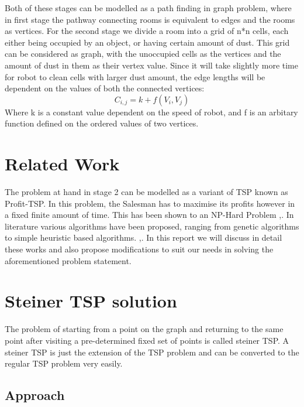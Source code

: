 \documentclass{article}
\begin{document}
Both of these stages can be modelled as a path finding in graph problem, where in first stage the pathway connecting rooms is equivalent to edges and the rooms as vertices.
For the second stage we divide a room into a grid of n*n cells, each either being occupied by an object, or having certain amount of dust. This grid can be considered as graph,
with the unoccupied cells as the vertices and the amount of dust in them as their vertex value. Since it will take slightly more time for robot to clean cells with larger dust amount,
the edge lengths will be dependent on the values of both the connected vertices:
\begin{equation}
    C_{i,j} = k + f(V_i,V_j)
\end{equation}
Where k is a constant value dependent on the speed of robot, and f is an arbitary function defined on the ordered values of two vertices.




\section{Related Work}

The problem at hand in stage 2 can be modelled as a variant of TSP  known as Profit-TSP. In this problem,
the Salesman has to maximise its profits however in a fixed finite amount of time. 
This has been shown to an NP-Hard Problem \cite{RAMESH1991151},\cite{apps2}. 
In literature various algorithms have been proposed, ranging from genetic algorithms to simple heuristic based algorithms. \cite{RAMESH1991151},\cite{rw1}.
In this report we will discuss in detail these works and also propose modifications to suit our needs in solving the aforementioned problem statement.



\section{Steiner TSP solution}

The problem of starting from a point on the graph and returning to the same point after visiting a pre-determined fixed
set of points is called steiner TSP. A steiner TSP is just the extension of the TSP problem and can be converted to the
regular TSP problem very easily.

\subsection{Approach}
\end{document}
